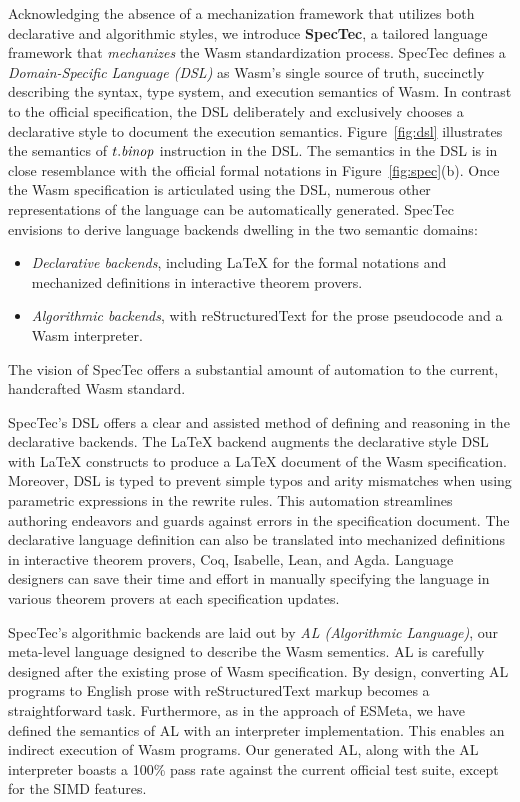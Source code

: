 Acknowledging the absence of a mechanization framework that utilizes both declarative and algorithmic styles, we introduce \textbf{SpecTec}, a tailored language framework that \textit{mechanizes} the Wasm standardization process. 
SpecTec defines a \emph{Domain-Specific Language (DSL)} as Wasm's single source of truth, succinctly describing the syntax, type system, and execution semantics of Wasm. 
In contrast to the official specification, the DSL deliberately and exclusively chooses a declarative style to document the execution semantics. 
Figure~\ref{fig:dsl} illustrates the semantics of $t.\mbox{\emph{binop}}$ instruction in the DSL. 
The semantics in the DSL is in close resemblance with the official formal notations in Figure~\ref{fig:spec}(b). 
Once the Wasm specification is articulated using the DSL, numerous other representations of the language can be automatically generated. 
SpecTec envisions to derive language backends dwelling in the two semantic domains:
\begin{itemize}
  \item
    \textit{Declarative backends}, including LaTeX for the formal notations and mechanized definitions in interactive theorem provers.
  \item
    \textit{Algorithmic backends}, with reStructuredText for the prose pseudocode and a Wasm interpreter.
\end{itemize}
The vision of SpecTec offers a substantial amount of automation to the current, handcrafted Wasm standard. 

SpecTec's DSL offers a clear and assisted method of defining and reasoning in the declarative backends.
The LaTeX backend augments the declarative style DSL with LaTeX constructs to produce a LaTeX document of the Wasm specification. 
Moreover, DSL is typed to prevent simple typos and arity mismatches when using parametric expressions in the rewrite rules. 
This automation streamlines authoring endeavors and guards against errors in the specification document.  
The declarative language definition can also be translated into mechanized definitions in interactive theorem provers, Coq, Isabelle, Lean, and Agda. 
Language designers can save their time and effort in manually specifying the language in various theorem provers at each specification updates. 

SpecTec's algorithmic backends are laid out by \emph{AL (Algorithmic Language)}, our meta-level language designed to describe the Wasm sementics. 
AL is carefully designed after the existing prose of Wasm specification. 
By design, converting AL programs to English prose with reStructuredText markup becomes a straightforward task. 
Furthermore, as in the approach of ESMeta, we have defined the semantics of AL with an interpreter implementation. 
This enables an indirect execution of Wasm programs. 
Our generated AL, along with the AL interpreter boasts a 100\% pass rate against the current official test suite, except for the SIMD features.

